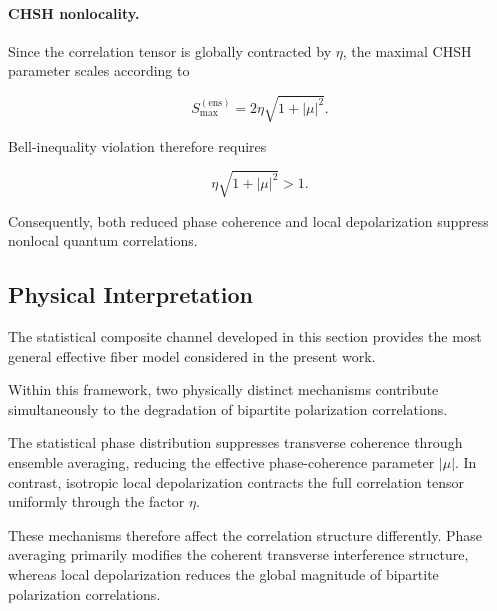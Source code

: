 \medskip

\paragraph{CHSH nonlocality.}

Since the correlation tensor is globally contracted by \( \eta \), the maximal CHSH parameter scales according to

\begin{equation}
S_{\max}^{(\mathrm{ens})}
=
2\eta
\sqrt{
1+|\mu|^2
}.
\label{eq:ensemble_composite_chsh}
\end{equation}

Bell-inequality violation therefore requires

\begin{equation}
\eta
\sqrt{
1+|\mu|^2
}
>
1.
\label{eq:ensemble_composite_chsh_threshold}
\end{equation}

Consequently, both reduced phase coherence and local depolarization suppress nonlocal quantum correlations.

\medskip


\subsection{Physical Interpretation}

The statistical composite channel developed in this section provides the most general effective fiber model considered in the present work.

\medskip

Within this framework, two physically distinct mechanisms contribute simultaneously to the degradation of bipartite polarization correlations.

\medskip

The statistical phase distribution suppresses transverse coherence through ensemble averaging, reducing the effective phase-coherence parameter \( |\mu| \). In contrast, isotropic local depolarization contracts the full correlation tensor uniformly through the factor \( \eta \).

\medskip

These mechanisms therefore affect the correlation structure differently. Phase averaging primarily modifies the coherent transverse interference structure, whereas local depolarization reduces the global magnitude of bipartite polarization correlations.

